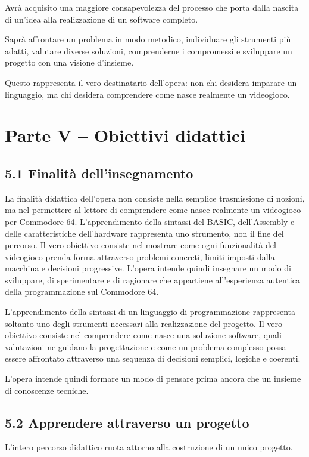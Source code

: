 \documentclass{article}
\begin{document}
Avrà acquisito una maggiore consapevolezza del processo che porta dalla nascita di un'idea alla realizzazione di un
software completo.

Saprà affrontare un problema in modo metodico, individuare gli strumenti più adatti, valutare diverse soluzioni,
comprenderne i compromessi e sviluppare un progetto con una visione d'insieme.

Questo rappresenta il vero destinatario dell'opera: non chi desidera imparare un linguaggio, ma chi desidera comprendere
come nasce realmente un videogioco.

\section{Parte V – Obiettivi didattici}
\subsection[5.1 Finalità dell{}'insegnamento]{5.1 Finalità dell'insegnamento}
La finalità didattica dell'opera non consiste nella semplice trasmissione di nozioni, ma nel permettere al lettore di
comprendere come nasce realmente un videogioco per Commodore 64. L'apprendimento della sintassi del BASIC,
dell'Assembly e delle caratteristiche dell'hardware rappresenta uno strumento, non il fine del percorso. Il vero
obiettivo consiste nel mostrare come ogni funzionalità del videogioco prenda forma attraverso problemi concreti, limiti
imposti dalla macchina e decisioni progressive. L'opera intende quindi insegnare un modo di sviluppare, di sperimentare
e di ragionare che appartiene all'esperienza autentica della programmazione sul Commodore 64.

L'apprendimento della sintassi di un linguaggio di programmazione rappresenta soltanto uno degli strumenti necessari
alla realizzazione del progetto. Il vero obiettivo consiste nel comprendere come nasce una soluzione software, quali
valutazioni ne guidano la progettazione e come un problema complesso possa essere affrontato attraverso una sequenza di
decisioni semplici, logiche e coerenti.

L'opera intende quindi formare un modo di pensare prima ancora che un insieme di conoscenze tecniche.

\subsection{5.2 Apprendere attraverso un progetto}
L'intero percorso didattico ruota attorno alla costruzione di un unico progetto.
\end{document}
